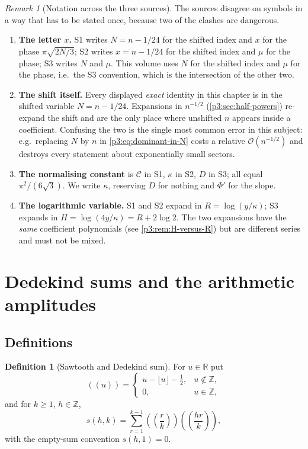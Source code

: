 \documentclass[11pt,a4paper,oneside]{book}
\theoremstyle{plain}
\theoremstyle{definition}
\newtheorem{definition}[theorem]{Definition}
\theoremstyle{remark}
\newtheorem{remark}[theorem]{Remark}
\newcommand{\Int}{\mathbb{Z}}
\newcommand{\Real}{\mathbb{R}}
\newcommand{\bigO}{\mathcal{O}}
\begin{document}
\begin{remark}[Notation across the three sources]\label{p3:rem:notation-clash}
The sources disagree on symbols in a way that has to be stated once, because two of the clashes
are dangerous.
\begin{enumerate}
\item \textbf{The letter $x$.}  S1 writes $N=n-1/24$ for the shifted index and
$x$ for the phase $\pi\sqrt{2N/3}$; S2 writes $x=n-1/24$ for the shifted index and $\mu$ for the
phase; S3 writes $N$ and $\mu$. This volume uses $N$ for the shifted index and $\mu$ for the
phase, i.e.\ the S3 convention, which is the intersection of the other two.
\item \textbf{The shift itself.}  Every displayed \emph{exact} identity in this
chapter is in the shifted variable $N=n-1/24$. Expansions in $n^{-1/2}$
(\cref{p3:sec:half-powers}) re-expand the shift and are the only place where unshifted $n$ appears
inside a coefficient. Confusing the two is the single most common error in this subject: e.g.\
replacing $N$ by $n$ in \cref{p3:eq:dominant-in-N} costs a relative $\bigO(n^{-1/2})$ and
destroys every statement about exponentially small sectors.
\item \textbf{The normalising constant} is $\mathcal{C}$ in S1, $\kappa$ in S2, $D$
in S3; all equal $\pi^{2}/(6\sqrt3)$. We write $\kappa$, reserving $D$ for nothing and $\Phi'$ for
the slope.
\item \textbf{The logarithmic variable.}  S1 and S2 expand in
$R=\log(y/\kappa)$; S3 expands in $H=\log(4y/\kappa)=R+2\log2$. The two expansions have the
\emph{same} coefficient polynomials (see \cref{p3:rem:H-versus-R}) but are different series and
must not be mixed.
\end{enumerate}
\end{remark}

\section{Dedekind sums and the arithmetic amplitudes}\label{p3:sec:arithmetic}

\subsection{Definitions}

\begin{definition}[Sawtooth and Dedekind sum]\label{p3:def:dedekind}
For $u\in\Real$ put
\begin{equation}\label{p3:eq:sawtooth}
 ((u))=\begin{cases} u-\lfloor u\rfloor-\tfrac12,& u\notin\Int,\\ 0,& u\in\Int,\end{cases}
\end{equation}
and for $k\ge1$, $h\in\Int$,
\begin{equation}\label{p3:eq:dedekind}
 s(h,k)=\sum_{r=1}^{k-1}\left(\!\left(\frac rk\right)\!\right)
 \left(\!\left(\frac{hr}{k}\right)\!\right),
\end{equation}
with the empty-sum convention $s(h,1)=0$.
\end{definition}
\end{document}
